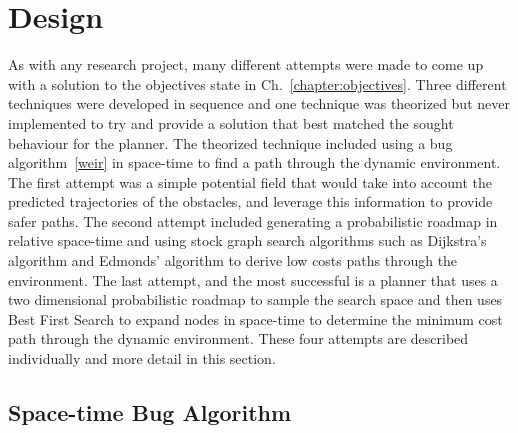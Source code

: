 


\chapter{Design}

\label{chapter:design}

As with any research project, many different attempts were made to come up with
a solution to the objectives state in Ch.~\ref{chapter:objectives}. Three
different techniques were developed in sequence and one technique was theorized
but never implemented to try and provide a solution that best matched the
sought behaviour for the planner.  The theorized technique included using a bug
algorithm~\ref{weir} in space-time to find a path through the dynamic
environment.  The first attempt was a simple potential field that would take
into account the predicted trajectories of the obstacles, and leverage this
information to provide safer paths. The second attempt included generating a
probabilistic roadmap in relative space-time and using stock graph search
algorithms such as Dijkstra's algorithm and Edmonds' algorithm to derive low
costs paths through the environment. The last attempt, and the most successful
is a planner that uses a two dimensional probabilistic roadmap to sample the
search space and then uses Best First Search to expand nodes in space-time to
determine the minimum cost path through the dynamic environment.  These four
attempts are described individually and more detail in this section.

\section{Space-time Bug Algorithm}

